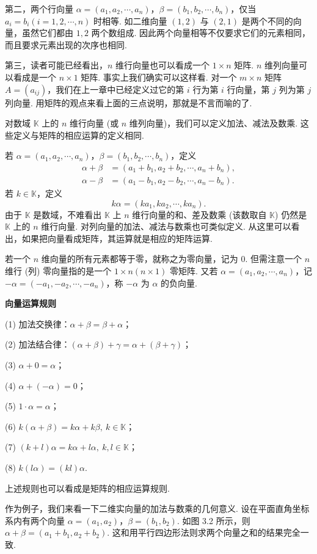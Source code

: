 \documentclass[UTF8, 12pt, fontset=fandol, oneside]{ctexart}
\begin{document}
第二，两个行向量 $\alpha=(a_1,a_2,\cdots,a_n)$，$\beta=(b_1,b_2,\cdots,b_n)$，仅当 $a_i=b_i(i=1,2,\cdots,n)$ 时相等. 如二维向量 $(1,2)$ 与 $(2,1)$ 是两个不同的向量，虽然它们都由 $1,2$ 两个数组成. 因此两个向量相等不仅要求它们的元素相同，而且要求元素出现的次序也相同.

第三，读者可能已经看出，$n$ 维行向量也可以看成一个 $1\times n$ 矩阵. $n$ 维列向量可以看成是一个 $n\times 1$ 矩阵. 事实上我们确实可以这样看. 对一个 $m\times n$ 矩阵 $A=(a_{ij})$，我们在上一章中已经定义过它的第 $i$ 行为第 $i$ 行向量，第 $j$ 列为第 $j$ 列向量. 用矩阵的观点来看上面的三点说明，那就是不言而喻的了.

对数域 $\mathbb{K}$ 上的 $n$ 维行向量 (或 $n$ 维列向量)，我们可以定义加法、减法及数乘. 这些定义与矩阵的相应运算的定义相同.

若 $\alpha=(a_1,a_2,\cdots,a_n)$，$\beta=(b_1,b_2,\cdots,b_n)$，定义
\[
\begin{aligned}
\alpha+\beta&=(a_1+b_1,a_2+b_2,\cdots,a_n+b_n),\\
\alpha-\beta&=(a_1-b_1,a_2-b_2,\cdots,a_n-b_n).
\end{aligned}
\]
若 $k\in\mathbb{K}$，定义
\[
k\alpha=(ka_1,ka_2,\cdots,ka_n).
\]
由于 $\mathbb{K}$ 是数域，不难看出 $\mathbb{K}$ 上 $n$ 维行向量的和、差及数乘 (该数取自 $\mathbb{K}$) 仍然是 $\mathbb{K}$ 上的 $n$ 维行向量. 对列向量的加法、减法与数乘也可类似定义. 从这里可以看出，如果把向量看成矩阵，其运算就是相应的矩阵运算.

若一个 $n$ 维向量的所有元素都等于零，就称之为零向量，记为 $0$. 但需注意一个 $n$ 维行 (列) 零向量指的是一个 $1\times n(n\times 1)$ 零矩阵. 又若 $\alpha=(a_1,a_2,\cdots,a_n)$，记 $-\alpha=(-a_1,-a_2,\cdots,-a_n)$，称 $-\alpha$ 为 $\alpha$ 的负向量.

\noindent\textbf{向量运算规则}

(1) 加法交换律：$\alpha+\beta=\beta+\alpha$；

(2) 加法结合律：$(\alpha+\beta)+\gamma=\alpha+(\beta+\gamma)$；

(3) $\alpha+0=\alpha$；

(4) $\alpha+(-\alpha)=0$；

(5) $1\cdot\alpha=\alpha$；

(6) $k(\alpha+\beta)=k\alpha+k\beta,\ k\in\mathbb{K}$；

(7) $(k+l)\alpha=k\alpha+l\alpha,\ k,l\in\mathbb{K}$；

(8) $k(l\alpha)=(kl)\alpha$.

上述规则也可以看成是矩阵的相应运算规则.

作为例子，我们来看一下二维实向量的加法与数乘的几何意义. 设在平面直角坐标系内有两个向量 $\alpha=(a_1,a_2)$，$\beta=(b_1,b_2)$. 如图 3.2 所示，则 $\alpha+\beta=(a_1+b_1,a_2+b_2)$. 这和用平行四边形法则求两个向量之和的结果完全一致.
\end{document}

